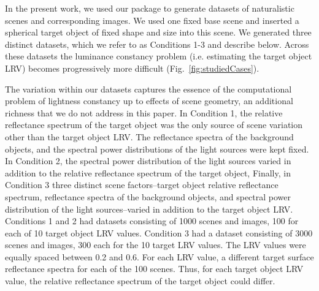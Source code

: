 \documentclass{jov}
\begin{document}
In the present work, we used our package to generate datasets of naturalistic scenes and corresponding images.
We used one fixed base scene and inserted a spherical target object of fixed shape and size into this scene.
We generated three distinct datasets, which we refer to as Conditions 1-3 and describe below.
Across these datasets the luminance constancy problem (i.e. estimating the target object LRV)
becomes progressively more difficult (Fig.~\ref{fig:studiedCases}).

The variation within our datasets captures the essence of the computational problem of lightness constancy
up to effects of scene geometry, an additional richness that we do not address in this paper.
In Condition 1, the relative reflectance spectrum of the target object was the only source of scene variation other than the target object LRV.
The reflectance spectra of the background objects, and the spectral power distributions of the light sources were kept fixed.
In Condition 2, the spectral power distribution of the light sources varied in addition to the relative reflectance spectrum of the target object,
Finally, in Condition 3 three distinct scene factors--target object relative reflectance spectrum, reflectance spectra of the background objects, and
spectral power distribution of the light sources--varied in addition to the target object LRV.
Conditions 1 and 2 had datasets consisting of 1000 scenes and images, 100 for each of 10 target object LRV values. 
Condition 3 had a dataset consisting of 3000 scenes and images, 300 each for the 10 target LRV values.
The LRV values were equally spaced between 0.2 and 0.6. For each LRV value, a different target surface reflectance spectra for each of the 100 scenes. Thus, for each target object LRV value, the relative reflectance spectrum of the target object could differ.
\end{document}
